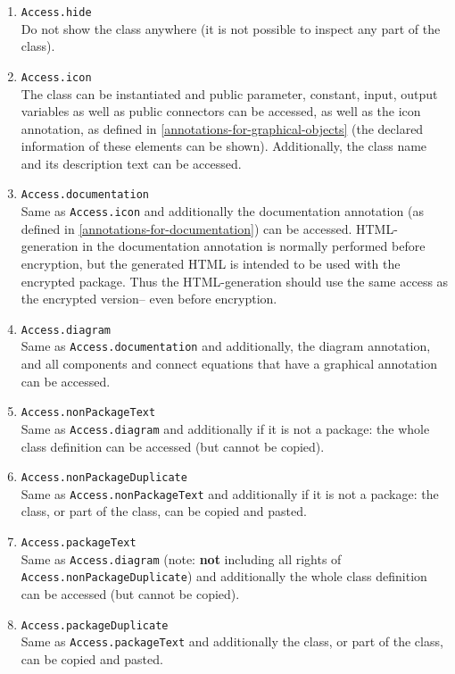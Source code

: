 \begin{enumerate}
\item
  \lstinline!Access.hide!\\
  Do not show the class anywhere (it is not possible to inspect any part
  of the class).
\item
  \lstinline!Access.icon!\textbf{\\
  }The class can be instantiated and public parameter, constant, input,
  output variables as well as public connectors can be accessed, as well
  as the icon annotation, as defined in \autoref{annotations-for-graphical-objects} (the declared
  information of these elements can be shown). Additionally, the class
  name and its description text can be accessed.
\item
  \lstinline!Access.documentation!\\
  Same as \lstinline!Access.icon! and additionally the documentation annotation (as
  defined in \autoref{annotations-for-documentation}) can be accessed. HTML-generation in the
  documentation annotation is normally performed before encryption, but
  the generated HTML is intended to be used with the encrypted package.
  Thus the HTML-generation should use the same access as the encrypted
  version-- even before encryption.
\item
  \lstinline!Access.diagram!\\
  Same as \lstinline!Access.documentation! and additionally, the diagram annotation,
  and all components and connect equations that have a graphical
  annotation can be accessed.
\item
  \lstinline!Access.nonPackageText!\\
  Same as \lstinline!Access.diagram! and additionally if it is not a package: the
  whole class definition can be accessed (but cannot be copied).
\item
  \lstinline!Access.nonPackageDuplicate!\\
  Same as \lstinline!Access.nonPackageText! and additionally if it is not a package:
  the class, or part of the class, can be copied and pasted.
\item
  \lstinline!Access.packageText!\\
  Same as \lstinline!Access.diagram! (note: \textbf{not} including all rights of
  \lstinline!Access.nonPackageDuplicate!) and additionally the whole class
  definition can be accessed (but cannot be copied).
\item
  \lstinline!Access.packageDuplicate!\\
  Same as \lstinline!Access.packageText! and additionally the class, or part of the
  class, can be copied and pasted.
\end{enumerate}


